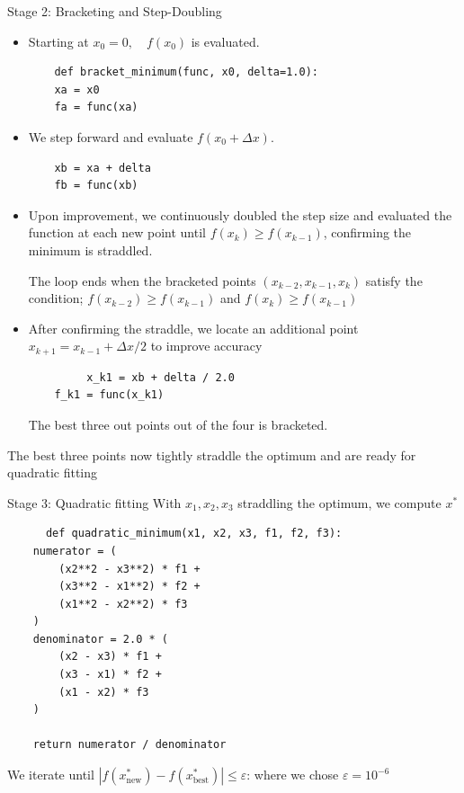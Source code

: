 \documentclass{beamer}
\begin{document}
\begin{frame}{Stage 2: Bracketing and Step-Doubling}
\begin{itemize}
    \item Starting at $x_0 = 0, \quad f(x_0) $ is evaluated.
    \begin{lstlisting}
    def bracket_minimum(func, x0, delta=1.0):
    xa = x0
    fa = func(xa)
    \end{lstlisting}
    \item  We step forward and evaluate $f(x_0+\Delta x)$.
    \begin{lstlisting}
    xb = xa + delta
    fb = func(xb)
    \end{lstlisting}
    \item Upon improvement, we continuously doubled the step size and evaluated the function at each new point until $f(x_k) \geq f(x_{k-1})$, confirming the minimum is straddled.\vspace{0.5cm}

The loop ends when the bracketed points $(x_{k-2}, x_{k-1}, x_{k})$ satisfy the condition; \quad $f(x_{k-2}) \geq f(x_{k-1})$ and
  $f(x_k) \geq f(x_{k-1})$ \vspace{0.5cm}

    \item After confirming the straddle, we locate an additional point $x_{k+1}=x_{k-1}+\Delta x/2$ to improve accuracy
    \begin{lstlisting}
         x_k1 = xb + delta / 2.0
    f_k1 = func(x_k1)
    \end{lstlisting}
    The best three out points out of the four is bracketed. 
\end{itemize}

The best three points now tightly straddle the optimum
  and are ready for quadratic fitting
\end{frame}

\begin{frame}[fragile, ]{Stage 3: Quadratic fitting}
    With $x_1, x_2, x_3$ straddling the optimum, we compute
  $x^*$ \cite{odekunle2009}
  \begin{lstlisting}
      def quadratic_minimum(x1, x2, x3, f1, f2, f3):
    numerator = (
        (x2**2 - x3**2) * f1 +
        (x3**2 - x1**2) * f2 +
        (x1**2 - x2**2) * f3
    )
    denominator = 2.0 * (
        (x2 - x3) * f1 +
        (x3 - x1) * f2 +
        (x1 - x2) * f3
    )

    return numerator / denominator
  \end{lstlisting}
   We iterate until $|f(x^*_{\text{new}}) -
  f(x^*_{\text{best}})| \leq \varepsilon$: where we chose $\varepsilon =10^{-6}$
\end{frame}
\end{document}

